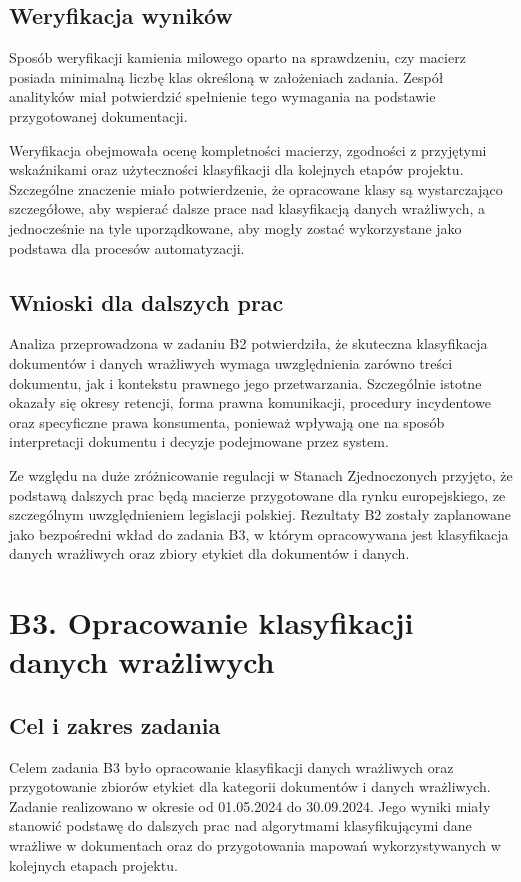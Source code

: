 \documentclass[12pt,a4paper]{report}
\begin{document}
\subsection{Weryfikacja wyników}
Sposób weryfikacji kamienia milowego oparto na sprawdzeniu, czy macierz posiada minimalną liczbę klas określoną w założeniach zadania. Zespół analityków miał potwierdzić spełnienie tego wymagania na podstawie przygotowanej dokumentacji.

Weryfikacja obejmowała ocenę kompletności macierzy, zgodności z przyjętymi wskaźnikami oraz użyteczności klasyfikacji dla kolejnych etapów projektu. Szczególne znaczenie miało potwierdzenie, że opracowane klasy są wystarczająco szczegółowe, aby wspierać dalsze prace nad klasyfikacją danych wrażliwych, a jednocześnie na tyle uporządkowane, aby mogły zostać wykorzystane jako podstawa dla procesów automatyzacji.

\subsection{Wnioski dla dalszych prac}
Analiza przeprowadzona w zadaniu B2 potwierdziła, że skuteczna klasyfikacja dokumentów i danych wrażliwych wymaga uwzględnienia zarówno treści dokumentu, jak i kontekstu prawnego jego przetwarzania. Szczególnie istotne okazały się okresy retencji, forma prawna komunikacji, procedury incydentowe oraz specyficzne prawa konsumenta, ponieważ wpływają one na sposób interpretacji dokumentu i decyzje podejmowane przez system.

Ze względu na duże zróżnicowanie regulacji w Stanach Zjednoczonych przyjęto, że podstawą dalszych prac będą macierze przygotowane dla rynku europejskiego, ze szczególnym uwzględnieniem legislacji polskiej. Rezultaty B2 zostały zaplanowane jako bezpośredni wkład do zadania B3, w którym opracowywana jest klasyfikacja danych wrażliwych oraz zbiory etykiet dla dokumentów i danych.



\section{B3. Opracowanie klasyfikacji danych wrażliwych}
\subsection{Cel i zakres zadania}
Celem zadania B3 było opracowanie klasyfikacji danych wrażliwych oraz przygotowanie zbiorów etykiet dla kategorii dokumentów i danych wrażliwych. Zadanie realizowano w okresie od 01.05.2024 do 30.09.2024. Jego wyniki miały stanowić podstawę do dalszych prac nad algorytmami klasyfikującymi dane wrażliwe w dokumentach oraz do przygotowania mapowań wykorzystywanych w kolejnych etapach projektu.
\end{document}
